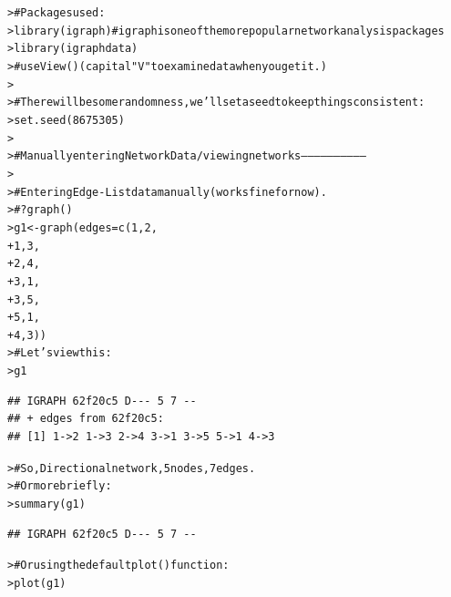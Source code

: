 \documentclass[12pt]{article}\usepackage[]{graphicx}\usepackage[]{color}
\makeatletter
\newcommand{\hlnum}[1]{\textcolor[rgb]{0.82,0.78,0.62}{#1}}%
\newcommand{\hlcom}[1]{\textcolor[rgb]{0.404,0.408,0.42}{#1}}%
\newcommand{\hlstd}[1]{\textcolor[rgb]{0.882,0.878,0.898}{#1}}%
\newcommand{\hlkwb}[1]{\textcolor[rgb]{0.902,0.675,0.196}{#1}}%
\newcommand{\hlkwc}[1]{\textcolor[rgb]{0.812,0.522,0.388}{#1}}%
\newcommand{\hlkwd}[1]{\textcolor[rgb]{0.733,0.388,0.812}{#1}}%
\newenvironment{kframe}{%
 \def\at@end@of@kframe{}%
 \ifinner\ifhmode%
  \def\at@end@of@kframe{\end{minipage}}%
  \begin{minipage}{\columnwidth}%
 \fi\fi%
 \def\FrameCommand##1{\hskip\@totalleftmargin \hskip-\fboxsep
 \colorbox{shadecolor}{##1}\hskip-\fboxsep
     \hskip-\linewidth \hskip-\@totalleftmargin \hskip\columnwidth}%
 \MakeFramed {\advance\hsize-\width
   \@totalleftmargin\z@ \linewidth\hsize
   \@setminipage}}%
 {\par\unskip\endMakeFramed%
 \at@end@of@kframe}
\newenvironment{knitrout}{}{} %
\makeatother
\begin{document}
\begin{flushleft}
\begin{center}
\begin{knitrout}
\color{fgcolor}\begin{kframe}
\begin{alltt}
\hlstd{> }\hlcom{# Packages used:}
\hlstd{> }\hlkwd{library}\hlstd{(igraph)} \hlcom{# igraph is one of the more popular network analysis packages}
\hlstd{> }\hlkwd{library}\hlstd{(igraphdata)}
\hlstd{> }\hlcom{# use  View() (capital "V" to examine data when you get it.)}
\hlstd{> }
\hlstd{> }\hlcom{# There will be some randomness, we'll set a seed to keep things consistent:}
\hlstd{> }\hlkwd{set.seed}\hlstd{(}\hlnum{8675305}\hlstd{)}
\hlstd{> }
\hlstd{> }\hlcom{# Manually entering Network Data/ viewing networks -----------------------------}
\hlstd{> }
\hlstd{> }\hlcom{# Entering Edge-List data manually (works fine for now).}
\hlstd{> }\hlcom{# ?graph()}
\hlstd{> }\hlstd{g1} \hlkwb{<-} \hlkwd{graph}\hlstd{(}\hlkwc{edges}\hlstd{=}\hlkwd{c}\hlstd{(}\hlnum{1}\hlstd{,}\hlnum{2}\hlstd{,}
\hlstd{+ }                    \hlnum{1}\hlstd{,}\hlnum{3}\hlstd{,}
\hlstd{+ }                    \hlnum{2}\hlstd{,}\hlnum{4}\hlstd{,}
\hlstd{+ }                    \hlnum{3}\hlstd{,}\hlnum{1}\hlstd{,}
\hlstd{+ }                    \hlnum{3}\hlstd{,}\hlnum{5}\hlstd{,}
\hlstd{+ }                    \hlnum{5}\hlstd{,}\hlnum{1}\hlstd{,}
\hlstd{+ }                    \hlnum{4}\hlstd{,}\hlnum{3}\hlstd{))}
\hlstd{> }\hlcom{# Let's view this:}
\hlstd{> }\hlstd{g1}
\end{alltt}
\begin{verbatim}
## IGRAPH 62f20c5 D--- 5 7 -- 
## + edges from 62f20c5:
## [1] 1->2 1->3 2->4 3->1 3->5 5->1 4->3
\end{verbatim}
\begin{alltt}
\hlstd{> }\hlcom{# So, Directional network, 5 nodes, 7 edges.}
\hlstd{> }\hlcom{# Or more briefly:}
\hlstd{> }\hlkwd{summary}\hlstd{(g1)}
\end{alltt}
\begin{verbatim}
## IGRAPH 62f20c5 D--- 5 7 --
\end{verbatim}
\begin{alltt}
\hlstd{> }\hlcom{# Or using the default plot() function:}
\hlstd{> }\hlkwd{plot}\hlstd{(g1)}
\end{alltt}
\end{kframe}

\end{knitrout}
\end{center}
\end{flushleft}
\end{document}
